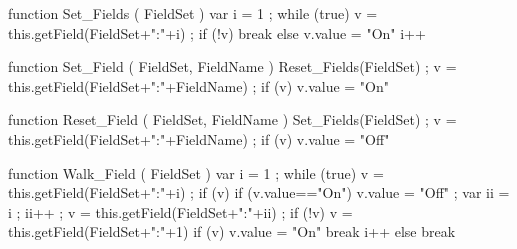 function Set_Fields ( FieldSet )
  { var i = 1 ;
    while (true)
      { v = this.getField(FieldSet+":"+i) ;
        if (!v)
          { break }
        else
          { v.value = "On" }
        i++ } }

function Set_Field ( FieldSet, FieldName )
  { Reset_Fields(FieldSet) ;
    v = this.getField(FieldSet+":"+FieldName) ;
    if (v) { v.value = "On" } }

function Reset_Field ( FieldSet, FieldName )
  { Set_Fields(FieldSet) ;
    v = this.getField(FieldSet+":"+FieldName) ;
    if (v) { v.value = "Off" } }

function Walk_Field ( FieldSet )
  { var i = 1 ;
    while (true)
      { v = this.getField(FieldSet+":"+i) ;
        if (v)
          { if (v.value=="On")
              { v.value = "Off" ;
                var ii = i ; ii++ ;
                v = this.getField(FieldSet+":"+ii) ;
                if (!v)
                  { v = this.getField(FieldSet+":"+1) }
                if (v)
                  { v.value = "On" }
                break }
            i++ }
        else
          { break } } }

\stopJSpreamble

\endinput
